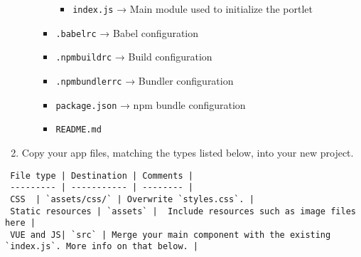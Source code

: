 \begin{enumerate}
\begin{itemize}
\begin{itemize}
      \begin{itemize}
      \tightlist
      \item
        \texttt{index.js} → Main module used to initialize the portlet
      \end{itemize}
    \item
      \texttt{.babelrc} → Babel configuration
    \item
      \texttt{.npmbuildrc} → Build configuration
    \item
      \texttt{.npmbundlerrc} → Bundler configuration
    \item
      \texttt{package.json} → npm bundle configuration
    \item
      \texttt{README.md}
    \end{itemize}
  \end{itemize}
\item
  Copy your app files, matching the types listed below, into your new
  project.
\end{enumerate}

\noindent\hrulefill

\begin{verbatim}
 File type | Destination | Comments |
 --------- | ----------- | -------- |
 CSS  | `assets/css/` | Overwrite `styles.css`. |
 Static resources | `assets` |  Include resources such as image files here |
 VUE and JS| `src` | Merge your main component with the existing `index.js`. More info on that below. |
\end{verbatim}

\noindent\hrulefill

